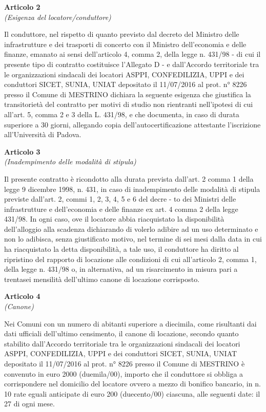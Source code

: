 \documentclass{contratto}
\begin{document}
\newpage
\begin{center}
\textbf{\Large Articolo 2}\\
\textit{(Esigenza del locatore/conduttore)}
\end{center}
 Il conduttore, nel rispetto di quanto previsto dal decreto del Ministro delle infrastrutture e dei trasporti di concerto con il Ministro dell’economia e delle finanze, emanato ai sensi dell'articolo 4, comma 2, della legge n. 431/98 - di cui il presente tipo di contratto costituisce l’Allegato D - e dall'Accordo territoriale tra le organizzazioni sindacali dei locatori ASPPI, CONFEDILIZIA, UPPI e dei conduttori SICET, SUNIA, UNIAT depositato il 11/07/2016 al prot. n° 8226 presso il Comune di MESTRINO dichiara la seguente esigenza che giustifica la transitorietà del contratto per motivi di studio non rientranti nell’ipotesi di cui all’art. 5, comma 2 e 3 della L. 431/98, e che documenta, in caso di durata superiore a 30 giorni, allegando copia dell’autocertificazione attestante l’iscrizione all'Università di Padova.


\begin{center}
\textbf{\Large Articolo 3}\\
\textit{(Inadempimento delle modalità di stipula)}
\end{center}
Il presente contratto è ricondotto alla durata prevista dall’art. 2 comma 1 della legge 9 dicembre 1998, n.
431, in caso di inadempimento delle modalità di stipula previste dall’art. 2, commi 1, 2, 3, 4, 5 e 6 del decre -
to dei Ministri delle infrastrutture e dell’economia e delle finanze ex art. 4 comma 2 della legge 431/98.
In ogni caso, ove il locatore abbia riacquistato la disponibilità dell'alloggio alla scadenza dichiarando di volerlo adibire ad un uso determinato e non lo adibisca, senza giustificato motivo, nel termine di sei mesi dalla
data in cui ha riacquistato la detta disponibilità, a tale uso, il conduttore ha diritto al ripristino del rapporto di
locazione alle condizioni di cui all'articolo 2, comma 1, della legge n. 431/98 o, in alternativa, ad un risarcimento in misura pari a trentasei mensilità dell'ultimo canone di locazione corrisposto.

\begin{center}
\textbf{\Large Articolo 4}\\
\textit{(Canone)}
\end{center}
Nei Comuni con un numero di abitanti superiore a diecimila, come risultanti dai dati ufficiali dell’ultimo censimento, il canone di locazione, secondo quanto stabilito dall'Accordo territoriale tra le organizzazioni sindacali dei locatori ASPPI, CONFEDILIZIA, UPPI e dei conduttori SICET, SUNIA, UNIAT depositato il 11/07/2016 al prot. n° 8226 presso il Comune di MESTRINO è convenuto in euro 2000 (duemila/00), importo che il conduttore si obbliga a corrispondere nel domicilio del locatore ovvero a mezzo di bonifico bancario, in n. 10 rate eguali anticipate di euro 200 (duecento/00) ciascuna, alle seguenti date: il 27 di ogni mese.
\end{document}
